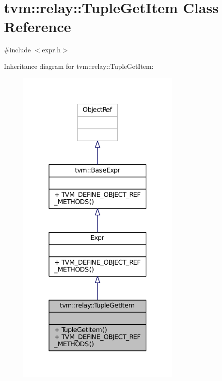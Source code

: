 \hypertarget{classtvm_1_1relay_1_1TupleGetItem}{}\section{tvm\+:\+:relay\+:\+:Tuple\+Get\+Item Class Reference}
\label{classtvm_1_1relay_1_1TupleGetItem}


{\ttfamily \#include $<$expr.\+h$>$}



Inheritance diagram for tvm\+:\+:relay\+:\+:Tuple\+Get\+Item\+:
\nopagebreak
\begin{figure}[H]
\begin{center}
\leavevmode
\includegraphics[width=230pt]{classtvm_1_1relay_1_1TupleGetItem__inherit__graph}
\end{center}
\end{figure}


